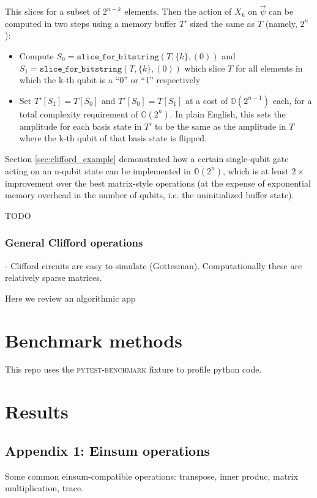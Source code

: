 \documentclass{article}
\begin{document}
This slices for a subset of $2^{n-k}$ elements. Then the action of $X_k$ on $\vec{\psi}$ can be computed in two steps using a memory buffer $T'$ sized the same as $T$ (namely, $2^n$):
\begin{itemize}
	\item Compute $S_0 = \texttt{slice\_for\_bitstring}(T, \{k\}, (0))$ and \\$S_1= \texttt{slice\_for\_bitstring}(T, \{k\}, (0))$ which slice $T$ for all elements in which the k-th qubit is a ``0'' or ``1'' respectively
	\item Set $T'[S_1] = T[S_0]$ and $T'[S_0] = T[S_1]$ at a cost of $\mathbb{O}(2^{n-1})$ each, for a total complexity requirement of $\mathbb{O}(2^n)$. In plain English, this sets the amplitude for each basis state in $T'$ to be the same as the amplitude in $T$ where the k-th qubit of that basis state is flipped. 
\end{itemize}


Section \ref{sec:clifford_example} demonstrated how a certain single-qubit gate acting on an n-qubit state can be implemented in $\mathbb{O}(2^n)$, which is at least $2\times$ improvement over the best matrix-style operations (at the expense of exponential memory overhead in the number of qubits, i.e. the uninitialized buffer state).


TODO
\subsubsection{General Clifford operations}
- Clifford circuits are easy to simulate (Gottesman). Computationally these are relatively sparse matrices.

Here we review an algorithmic app

\section{Benchmark methods}
This repo uses the \textsc{pytest-benchmark} fixture to profile python code.

\section{Results}


\begin{appendices}
\section{Appendix 1: Einsum operations}
\label{sec:a1}

Some common einsum-compatible operations: transpose, inner produc, matrix multiplication, trace.
\end{appendices}
\end{document}
